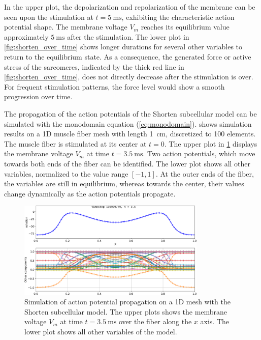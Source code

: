 In the upper plot, the depolarization and repolarization of the membrane can be seen upon the stimulation at $t=\SI{5}{\ms}$, exhibiting the characteristic action potential shape. The membrane voltage $V_m$ reaches its equilibrium value approximately $\SI{5}{\ms}$ after the stimulation. 
The lower plot in \cref{fig:shorten_over_time} shows longer durations for several other variables to return to the equilibrium state. As a consequence, the generated force or active stress of the sarcomeres, indicated by the thick red line in \cref{fig:shorten_over_time}, does not directly decrease after the stimulation is over. For frequent stimulation patterns, the force level would show a smooth progression over time.

The propagation of the action potentials of the Shorten subcellular model can be simulated with the monodomain equation (\cref{eq:monodomain}).  shows simulation results on a 1D muscle fiber mesh with length \SI{1}{\cm}, discretized to 100 elements. The muscle fiber is stimulated at its center at $t=0$. The upper plot in \cref{fig:shorten_03_50} displays the membrane voltage $V_m$ at time $t=\SI{3.5}{\ms}$. Two action potentials, which move towards both ends of the fiber can be identified. The lower plot shows all other variables, normalized to the value range $[-1,1]$. At the outer ends of the fiber, the variables are still in equilibrium, whereas towards the center, their values change dynamically as the action potentials propagate. 

\begin{figure}
  \centering%
  \includegraphics[width=0.8\textwidth]{images/results/basic/shorten_03_50.png}%
  \caption{Simulation of action potential propagation on a 1D mesh with the Shorten subcellular model. The upper plots shows the membrane voltage $V_m$ at time $t=\SI{3.5}{\ms}$ over the fiber along the $x$ axis. The lower plot shows all other variables of the model.}%
  \label{fig:shorten_03_50}%
\end{figure}%

